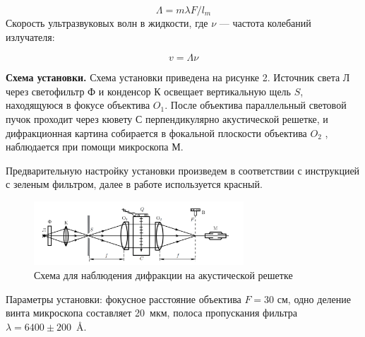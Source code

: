 \documentclass[a4paper,12pt]{article} %
\begin{document}
    	\begin{equation}\label{}
    	 \Lambda = m \lambda F/ l_m 
    	\end{equation}
    	Скорость ультразвуковых волн в жидкости, где $ \nu $ --- частота колебаний излучателя:
    	
    \begin{equation}\label{}
    	v = \Lambda \nu 
    \end{equation}
    
    \textbf{Схема установки. }Схема установки приведена на рисунке 2. Источник света Л через светофильтр Ф и конденсор К освещает вертикальную щель $ S $, находящуюся в фокусе объектива $ O_1 $. После объектива параллельный световой пучок проходит через кювету С перпендикулярно акустической решетке, и дифракционная картина собирается в фокальной плоскости объектива $ O_2 $ , наблюдается при помощи микроскопа М.

    Предварительную настройку установки произведем в соответствии с инструкцией с зеленым фильтром, далее в работе используется красный.
    
    	\begin{figure}[h!]
    	\centering	
    	\includegraphics[width=0.7\textwidth]{stand.png}
    	\caption{Схема для наблюдения дифракции на акустической решетке}
    	\label{shema1}
    \end{figure}
    
    Параметры установки: фокусное расстояние объектива $F = 30 $ см, одно деление винта микроскопа составляет 20~мкм, полоса пропускания фильтра \mbox{$\lambda = 6400\pm 200$ Å}.
	
\end{document}
